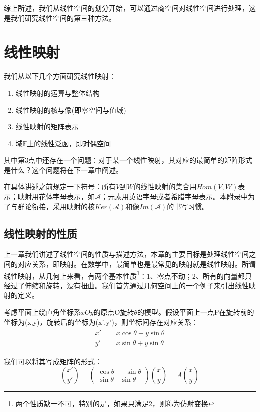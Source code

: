    综上所述，我们从线性空间的划分开始，可以通过商空间对线性空间进行处理，这是我们研究线性空间的第三种方法。
\section{线性映射}
我们从以下几个方面研究线性映射：
\begin{enumerate}
    \item 线性映射的运算与整体结构
    \item 线性映射的核与像(即零空间与值域)
    \item 线性映射的矩阵表示
    \item 域$\mathbb{F}$上的线性泛函，即对偶空间
\end{enumerate}

其中第3点中还存在一个问题：对于某一个线性映射，其对应的最简单的矩阵形式是什么？这个问题将在下一章中阐述。

\begin{remark}
    在具体讲述之前规定一下符号：所有$V$到$W$的线性映射的集合用$Hom(V,W)$表示；映射用花体字母表示，如$\mathscr{A}$；元素用英语字母或者希腊字母表示。本附录中为了与群论衔接，采用映射的核$Ker(\mathscr{A})$和像$Im(\mathscr{A})$的书写习惯。
\end{remark}
    \subsection{线性映射的性质}
    上一章我们讲述了线性空间的性质与描述方法，本章的主要目标是处理线性空间之间的对应关系，即映射。在数学中，最简单也是最常见的映射就是线性映射。所谓线性映射，从几何上来看，有两个基本性质\footnote{两个性质缺一不可，特别的是，如果只满足2，则称为仿射变换}：1、零点不动；2、所有的向量都只经过了伸缩和旋转，没有扭曲。我们首先通过几何空间上的一个例子来引出线性映射的定义。
    
    考虑平面上绕直角坐标系$xOy$的原点O旋转$\theta$的模型。假设平面上一点P在旋转前的坐标为(x,y)，旋转后的坐标为(x',y')，则坐标间存在对应关系：
    \begin{align}
        \begin{split}
            x'=&x\cos{\theta}-y\sin{\theta}\\
            y'=&x\sin{\theta}+y\sin{\theta}
        \end{split}
    \end{align}
    
    我们可以将其写成矩阵的形式：
    \begin{equation}
        \binom{x'}{y'}=\begin{pmatrix}
            \cos{\theta} & -\sin{\theta}\\
            \sin{\theta} & \sin{\theta}
        \end{pmatrix}\binom{x}{y}=A\binom{x}{y}
    \end{equation}
    
